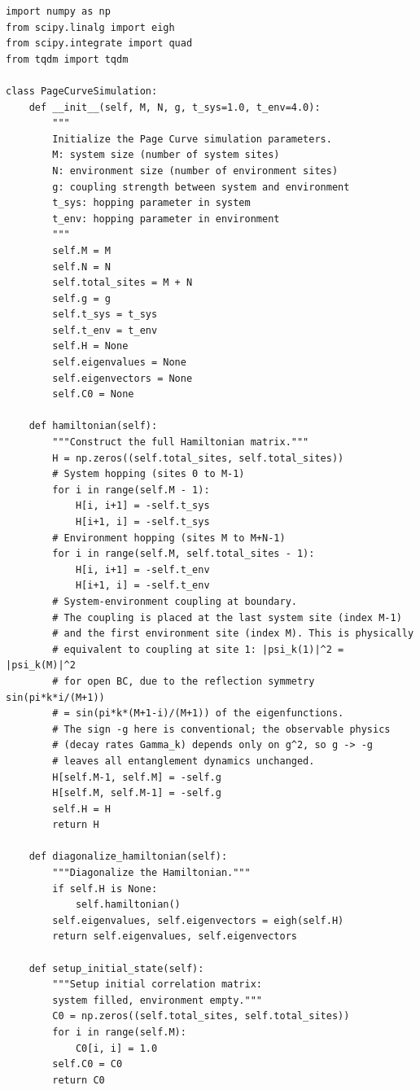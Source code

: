 \documentclass[12pt,oneside,openright]{report}
\theoremstyle{definition}
\theoremstyle{plain}
\theoremstyle{remark}
\begin{document}
\begin{lstlisting}[caption={Core simulation class for the fermionic Page curve model.}]
import numpy as np
from scipy.linalg import eigh
from scipy.integrate import quad
from tqdm import tqdm

class PageCurveSimulation:
    def __init__(self, M, N, g, t_sys=1.0, t_env=4.0):
        """
        Initialize the Page Curve simulation parameters.
        M: system size (number of system sites)
        N: environment size (number of environment sites)
        g: coupling strength between system and environment
        t_sys: hopping parameter in system
        t_env: hopping parameter in environment
        """
        self.M = M
        self.N = N
        self.total_sites = M + N
        self.g = g
        self.t_sys = t_sys
        self.t_env = t_env
        self.H = None
        self.eigenvalues = None
        self.eigenvectors = None
        self.C0 = None

    def hamiltonian(self):
        """Construct the full Hamiltonian matrix."""
        H = np.zeros((self.total_sites, self.total_sites))
        # System hopping (sites 0 to M-1)
        for i in range(self.M - 1):
            H[i, i+1] = -self.t_sys
            H[i+1, i] = -self.t_sys
        # Environment hopping (sites M to M+N-1)
        for i in range(self.M, self.total_sites - 1):
            H[i, i+1] = -self.t_env
            H[i+1, i] = -self.t_env
        # System-environment coupling at boundary.
        # The coupling is placed at the last system site (index M-1)
        # and the first environment site (index M). This is physically
        # equivalent to coupling at site 1: |psi_k(1)|^2 = |psi_k(M)|^2
        # for open BC, due to the reflection symmetry sin(pi*k*i/(M+1))
        # = sin(pi*k*(M+1-i)/(M+1)) of the eigenfunctions.
        # The sign -g here is conventional; the observable physics
        # (decay rates Gamma_k) depends only on g^2, so g -> -g
        # leaves all entanglement dynamics unchanged.
        H[self.M-1, self.M] = -self.g
        H[self.M, self.M-1] = -self.g
        self.H = H
        return H

    def diagonalize_hamiltonian(self):
        """Diagonalize the Hamiltonian."""
        if self.H is None:
            self.hamiltonian()
        self.eigenvalues, self.eigenvectors = eigh(self.H)
        return self.eigenvalues, self.eigenvectors

    def setup_initial_state(self):
        """Setup initial correlation matrix:
        system filled, environment empty."""
        C0 = np.zeros((self.total_sites, self.total_sites))
        for i in range(self.M):
            C0[i, i] = 1.0
        self.C0 = C0
        return C0


\end{lstlisting}
\end{document}

